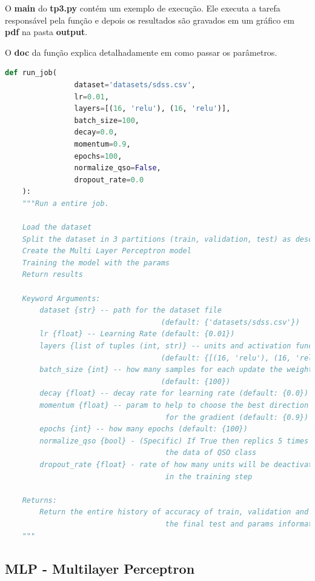 O \textbf{main} do \textbf{tp3.py} contém um exemplo de execução. Ele executa a tarefa responsável pela função  e depois os resultados são gravados em um gráfico em \textbf{pdf} na pasta \textbf{output}.

O \textbf{doc} da função explica detalhadamente em como passar os parâmetros.

\begin{lstlisting}[language=Python]
def run_job(
                dataset='datasets/sdss.csv',
                lr=0.01,
                layers=[(16, 'relu'), (16, 'relu')],
                batch_size=100,
                decay=0.0,
                momentum=0.9,
                epochs=100,
                normalize_qso=False,
                dropout_rate=0.0
    ):
    """Run a entire job.

    Load the dataset
    Split the dataset in 3 partitions (train, validation, test) as describe in documentation
    Create the Multi Layer Perceptron model
    Training the model with the params
    Return results
    
    Keyword Arguments:
        dataset {str} -- path for the dataset file
                                    (default: {'datasets/sdss.csv'})
        lr {float} -- Learning Rate (default: {0.01})
        layers {list of tuples (int, str)} -- units and activation function
                                    (default: {[(16, 'relu'), (16, 'relu')]})
        batch_size {int} -- how many samples for each update the weights
                                    (default: {100})
        decay {float} -- decay rate for learning rate (default: {0.0})
        momentum {float} -- param to help to choose the best direction
                                     for the gradient (default: {0.9})
        epochs {int} -- how many epochs (default: {100})
        normalize_qso {bool} - (Specific) If True then replics 5 times
                                     the data of QSO class
        dropout_rate {float} - rate of how many units will be deactivate
                                     in the training step
    
    Returns:
        Return the entire history of accuracy of train, validation and
                                     the final test and params information
    """
\end{lstlisting}


\subsection{MLP - Multilayer Perceptron}

